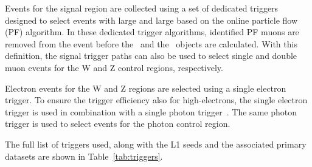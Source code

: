 Events for the signal region are collected using a set of dedicated
triggers designed to select events with large \ptmiss and large \mht based on
the online particle flow (PF) algorithm. In these dedicated trigger algorithms,
identified PF muons are removed from the event before the
\ptmiss~and the \mht~objects are calculated. With this definition,
the signal trigger paths can also be used to select single and double muon events for the W and Z control regions, respectively.

Electron events for the W and Z regions are selected using a single electron trigger.
To ensure the trigger efficiency also for high-\pt electrons, the single electron trigger is used in combination with
a single photon trigger~\cite{CMS-EGM-TWIKI-HLT}. The same photon trigger is used to select events for the photon control region.

The full list of triggers used, along with the L1 seeds and the associated primary datasets are shown in Table~\ref{tab:triggers}.

